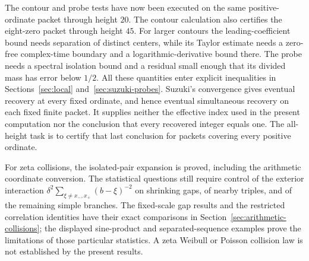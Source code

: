 The contour and probe tests have now been executed on the same
positive-ordinate packet through height $20$. The contour calculation
also certifies the eight-zero packet through height $45$.
For larger contours the leading-coefficient bound needs separation
of distinct centers, while its Taylor estimate needs a zero-free
complex-time boundary and a logarithmic-derivative bound there.
The probe needs a spectral isolation bound and a residual small
enough that its divided mass has error below $1/2$.
All these quantities enter explicit inequalities in
Sections~\ref{sec:local} and~\ref{sec:suzuki-probes}.
Suzuki's convergence gives eventual recovery at every fixed
ordinate, and hence eventual simultaneous recovery on each fixed
finite packet. It supplies neither the effective index used in the
present computation nor the conclusion that every recovered integer
equals one. The all-height task is to certify that last conclusion
for packets covering every positive ordinate.

For zeta collisions, the isolated-pair expansion is proved, including
the arithmetic coordinate conversion. The statistical questions
still require control of the exterior interaction
$\delta^2\sum_{\xi\ne x_-,x_+}(b-\xi)^{-2}$ on shrinking gaps,
of nearby triples, and of the remaining simple branches. The
fixed-scale gap results and the restricted correlation identities
have their exact comparisons in
Section~\ref{sec:arithmetic-collisions}; the displayed sine-product
and separated-sequence examples prove the limitations of those
particular statistics. A zeta Weibull or Poisson collision law is
not established by the present results.
